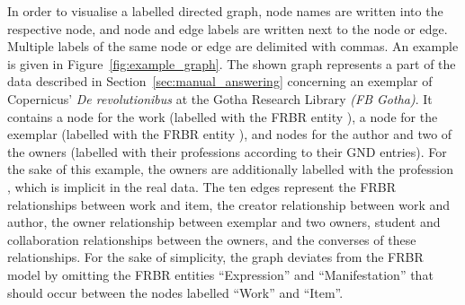 
In order to visualise a labelled directed graph,
node names are written into the respective node,
and node and edge labels are written next to the node or edge.
Multiple labels of the same node or edge are delimited with commas.
An example is given in Figure~\ref{fig:example_graph}.
The shown graph represents a part of the data described in Section~\ref{sec:manual_answering}
concerning an exemplar of Copernicus' \emph{De revolutionibus} at the
Gotha Research Library \emph{(FB Gotha)}.
It contains a node for the work (labelled with the FRBR entity ),
a node for the exemplar (labelled with the FRBR entity ),
and nodes for the author and two of the owners (labelled with their professions according to their GND entries).
For the sake of this example, the owners are additionally labelled with the profession
, which is implicit in the real data.
The ten edges represent the FRBR relationships between work and item,
the creator relationship between work and author,
the owner relationship between exemplar and two owners,
student and collaboration relationships between the owners,
and the converses of these relationships.
For the sake of simplicity, the graph deviates from the FRBR model \autocite{FRBR1998}
by omitting the FRBR entities \enquote{Expression} and \enquote{Manifestation}
that should occur between the nodes labelled \enquote{Work} and \enquote{Item}.

